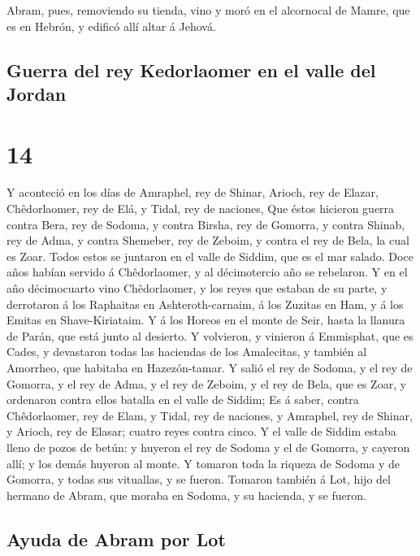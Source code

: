  Abram, pues, removiendo su tienda, vino y moró en el
alcornocal de Mamre, que es en Hebrón, y edificó allí altar á Jehová.

\hypertarget{guerra-del-rey-kedorlaomer-en-el-valle-del-jordan}{%
\subsection{Guerra del rey Kedorlaomer en el valle del
Jordan}\label{guerra-del-rey-kedorlaomer-en-el-valle-del-jordan}}

\hypertarget{section-13}{%
\section{14}\label{section-13}}

 Y aconteció en los días de Amraphel, rey de Shinar, Arioch,
rey de Elazar, Chêdorlaomer, rey de Elá, y Tidal, rey de naciones,
 Que éstos hicieron guerra contra Bera, rey de Sodoma, y
contra Birsha, rey de Gomorra, y contra Shinab, rey de Adma, y contra
Shemeber, rey de Zeboim, y contra el rey de Bela, la cual es Zoar.
 Todos estos se juntaron en el valle de Siddim, que es el
mar salado.  Doce años habían servido á Chêdorlaomer, y al
décimotercio año se rebelaron.  Y en el año décimocuarto
vino Chêdorlaomer, y los reyes que estaban de su parte, y derrotaron á
los Raphaitas en Ashteroth-carnaim, á los Zuzitas en Ham, y á los Emitas
en Shave-Kiriataim.  Y á los Horeos en el monte de Seir,
hasta la llanura de Parán, que está junto al desierto.  Y
volvieron, y vinieron á Emmisphat, que es Cades, y devastaron todas las
haciendas de los Amalecitas, y también al Amorrheo, que habitaba en
Hazezón-tamar.  Y salió el rey de Sodoma, y el rey de
Gomorra, y el rey de Adma, y el rey de Zeboim, y el rey de Bela, que es
Zoar, y ordenaron contra ellos batalla en el valle de Siddim;
 Es á saber, contra Chêdorlaomer, rey de Elam, y Tidal, rey
de naciones, y Amraphel, rey de Shinar, y Arioch, rey de Elasar; cuatro
reyes contra cinco.  Y el valle de Siddim estaba lleno de
pozos de betún: y huyeron el rey de Sodoma y el de Gomorra, y cayeron
allí; y los demás huyeron al monte.  Y tomaron toda la
riqueza de Sodoma y de Gomorra, y todas sus vituallas, y se fueron.
 Tomaron también á Lot, hijo del hermano de Abram, que
moraba en Sodoma, y su hacienda, y se fueron.

\hypertarget{ayuda-de-abram-por-lot}{%
\subsection{Ayuda de Abram por Lot}\label{ayuda-de-abram-por-lot}}

